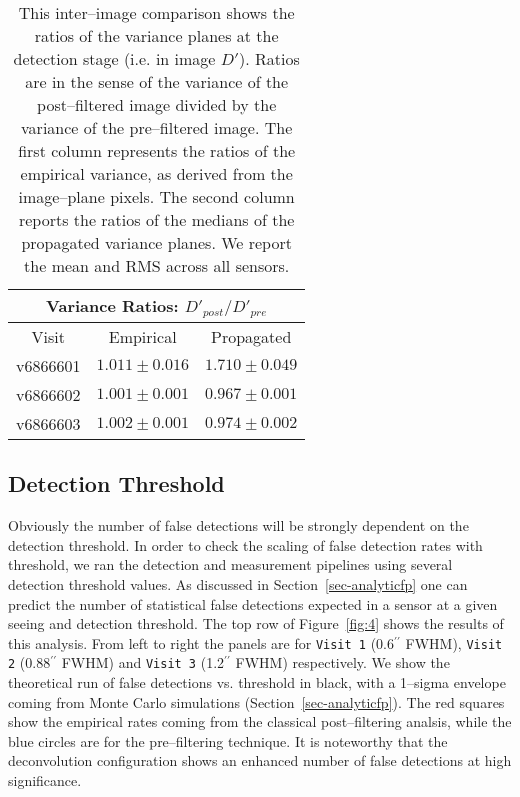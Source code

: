 \documentclass[iop]{emulateapj}
\begin{document}
\begin{table*}[t]
\centering
\begin{tabular}{ccc}
\hline
\multicolumn{3}{|c|}{Variance Ratios: $D'_{post} / D'_{pre}$} \\
\hline
Visit    & Empirical & Propagated \\
\hline
v6866601 & $1.011 \pm 0.016$    & $1.710 \pm 0.049$    \\
v6866602 & $1.001 \pm 0.001$    & $0.967 \pm 0.001$    \\
v6866603 & $1.002 \pm 0.001$    & $0.974 \pm 0.002$    \\
\end{tabular}
\caption{{\rm This inter--image comparison shows the ratios of the variance planes at the detection stage (i.e. in image $D'$).
  Ratios are in the sense of the variance of the post--filtered image divided by the variance of the pre--filtered image.
  The first column represents the ratios of the empirical variance, as derived from the image--plane pixels.
  The second column reports the ratios of the medians of the propagated variance planes.
  We report the mean and RMS across all sensors.
\label{tab-variance2}}}
\end{table*}


\subsection{Detection Threshold}
Obviously the number of false detections will be strongly dependent on the detection threshold.
In order to check the scaling of false detection rates with threshold, we ran the detection and measurement pipelines using several detection threshold values.
As discussed in Section~\ref{sec-analyticfp} one can predict the number of statistical false detections expected in a sensor at a given seeing and detection threshold.
The top row of Figure~\ref{fig:4} shows the results of this analysis.
From left to right the panels are for {\tt Visit 1} (0.6$^{\prime\prime}$ FWHM), {\tt Visit 2} (0.88$^{\prime\prime}$ FWHM) and {\tt Visit 3} (1.2$^{\prime\prime}$ FWHM) respectively.
We show the theoretical run of false detections vs. threshold in black, with a 1--sigma envelope coming from Monte Carlo simulations (Section~\ref{sec-analyticfp}).
The red squares show the empirical rates coming from the classical post--filtering analsis, while the blue circles are for the pre--filtering technique.
It is noteworthy that the deconvolution configuration shows an enhanced number of false detections at high significance.
\end{document}
